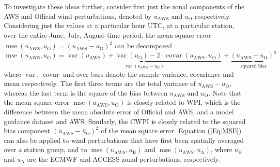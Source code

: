 \documentclass[twocol]{ametsoc}
\DeclareMathOperator{\mse}{mse}
\DeclareMathOperator{\covar}{covar}
\DeclareMathOperator{\var}{var}
\begin{document}
To investigate these ideas further, consider first just the zonal components of the AWS and Official wind perturbations, denoted by $u_\text{AWS}$ and $u_\text{O}$ respectively. Considering just the values at a particular hour UTC, at a particular station, over the entire June, July, August time period, the mean square error  $\mse\left(u_\text{AWS}, u_\text{O}\right) = \overline{\left(u_\text{AWS} - u_\text{O}\right)^2}$ can be decomposed
\begin{equation}
\mse\left(u_\text{AWS}, u_\text{O}\right) = \underbrace{\var\left(u_\text{AWS}\right) + \var\left(u_\text{O}\right) - 2 \cdot \covar\left(u_\text{AWS}, u_\text{O}\right)}_{\var\left(u_\text{AWS} - u_\text{O}\right)} + \underbrace{\left(\overline{u}_\text{AWS} - \overline{u}_\text{O}\right)^2}_{\text{squared bias}} \label{Eq:MSE}
\end{equation}
where $\var$, $\covar$ and over-bars denote the sample variance, covariance and mean respectively. The first three terms are the total variance of $u_\text{AWS} - u_\text{O}$, whereas the last term is the square of the bias between $u_\text{AWS}$ and $u_\text{O}$. Note that the mean square error $\mse\left(u_\text{AWS}, u_\text{O}\right)$ is closely related to $\overline{\text{WPI}}$, which is the difference between the mean absolute error of Official and AWS, and a model guidance dataset and AWS. Similarly, the CWPI is closely related to the squared bias component $\left(\overline{u}_\text{AWS} - \overline{u}_\text{O}\right)^2$ of the mean square error. Equation (\ref{Eq:MSE}) can also be applied to wind perturbations that have first been spatially averaged over a station group, and to $\mse\left(u_\text{AWS}, u_\text{E}\right)$ and $\mse\left(u_\text{AWS}, u_\text{A}\right)$, where $u_\text{E}$ and $u_\text{A}$ are the ECMWF and ACCESS zonal perturbations, respectively. 
\end{document}
